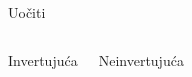 \begin{frame}[label=08-s020]{Uočiti}
\begin{columns}[T,onlytextwidth]\centering Invertujuća\par\medskip
{}\centering Neinvertujuća\par\medskip\end{columns}
\end{frame}
